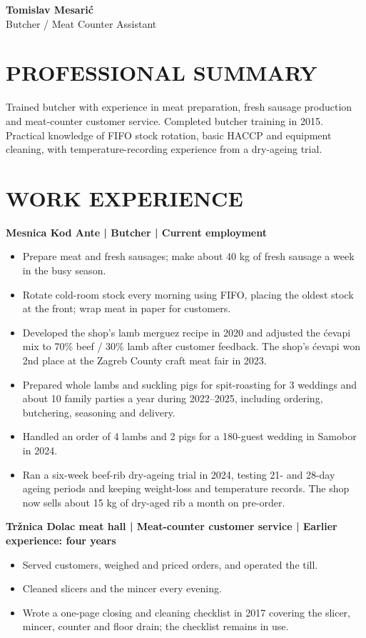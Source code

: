 \documentclass[11pt,a4paper]{article}
\newcommand{\cvsection}[1]{\section*{#1}}
\begin{document}
{\LARGE\bfseries\color{primarycolor} Tomislav Mesarić}\\[0.2em]
{\large\color{accentcolor} Butcher / Meat Counter Assistant}

\cvsection{PROFESSIONAL SUMMARY}
Trained butcher with experience in meat preparation, fresh sausage production and meat-counter customer service. Completed butcher training in 2015. Practical knowledge of FIFO stock rotation, basic HACCP and equipment cleaning, with temperature-recording experience from a dry-ageing trial.

\cvsection{WORK EXPERIENCE}
\textbf{Mesnica Kod Ante | Butcher | Current employment}
\begin{itemize}
\item Prepare meat and fresh sausages; make about 40 kg of fresh sausage a week in the busy season.
\item Rotate cold-room stock every morning using FIFO, placing the oldest stock at the front; wrap meat in paper for customers.
\item Developed the shop's lamb merguez recipe in 2020 and adjusted the ćevapi mix to 70\% beef / 30\% lamb after customer feedback. The shop's ćevapi won 2nd place at the Zagreb County craft meat fair in 2023.
\item Prepared whole lambs and suckling pigs for spit-roasting for 3 weddings and about 10 family parties a year during 2022–2025, including ordering, butchering, seasoning and delivery.
\item Handled an order of 4 lambs and 2 pigs for a 180-guest wedding in Samobor in 2024.
\item Ran a six-week beef-rib dry-ageing trial in 2024, testing 21- and 28-day ageing periods and keeping weight-loss and temperature records. The shop now sells about 15 kg of dry-aged rib a month on pre-order.
\end{itemize}

\textbf{Tržnica Dolac meat hall | Meat-counter customer service | Earlier experience: four years}
\begin{itemize}
\item Served customers, weighed and priced orders, and operated the till.
\item Cleaned slicers and the mincer every evening.
\item Wrote a one-page closing and cleaning checklist in 2017 covering the slicer, mincer, counter and floor drain; the checklist remains in use.
\end{itemize}
\end{document}
